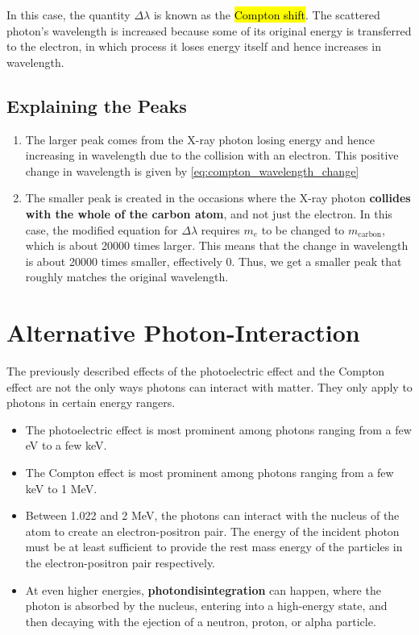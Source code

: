 \documentclass[a4paper,12pt]{article}
\let\oldsection\section
\renewcommand\section{\clearpage\oldsection}
\begin{document}
In this case, the quantity $\Delta \lambda$ is known as the \hl{Compton shift}.
The scattered photon's wavelength is increased because some of its original energy is transferred to the electron, in which process it loses energy itself and hence increases in wavelength.

\subsection{Explaining the Peaks}

\begin{enumerate}
  \item The larger peak comes from the X-ray photon losing energy and hence increasing in wavelength due to the collision with an electron. This positive change in wavelength is given by \cref{eq:compton_wavelength_change}
  \item The smaller peak is created in the occasions where the X-ray photon \textbf{collides with the whole of the carbon atom}, and not just the electron. In this case, the modified equation for $\Delta \lambda$ requires $m_e$ to be changed to $m_{\text{carbon}}$, which is about 20000 times larger. This means that the change in wavelength is about 20000 times smaller, effectively 0. Thus, we get a smaller peak that roughly matches the original wavelength.
\end{enumerate}

\section{Alternative Photon-Interaction}

The previously described effects of the photoelectric effect and the Compton effect are not the only ways photons can interact with matter. They only apply to photons in certain energy rangers.
\begin{itemize}
  \item The photoelectric effect is most prominent among photons ranging from a few eV to a few keV.
  \item The Compton effect is most prominent among photons ranging from a few keV to 1 MeV.
  \item Between 1.022 and 2 MeV, the photons can interact with the nucleus of the atom to create an electron-positron pair. The energy of the incident photon must be at least sufficient to provide the rest mass energy of the particles in the electron-positron pair respectively.
  \item At even higher energies, \textbf{photondisintegration} can happen, where the photon is absorbed by the nucleus, entering into a high-energy state, and then decaying with the ejection of a neutron, proton, or alpha particle.
\end{itemize}
\end{document}
